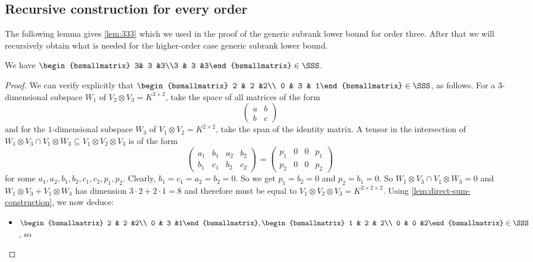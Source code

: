 \documentclass[10pt,a4paper]{article}
\theoremstyle{definition}
\theoremstyle{remark}
\begin{document}
\subsection{Recursive construction for every order}

The following lemma gives \autoref{lem:333} which we used in the proof of the generic subrank lower bound for order three. After that we will recursively obtain what is needed for the higher-order case generic subrank lower bound.

\begin{lemma}\label{lem:333-333}
We have $\begin{bsmallmatrix} 3& 3 &3\\3 & 3 &3\end{bsmallmatrix}\in \SSS$.
\end{lemma}
\begin{proof}
We can verify explicitly that $\begin{bsmallmatrix} 2 & 2 &2\\ 0 & 3 & 1\end{bsmallmatrix}\in \SSS$, as follows.
For a $3$-dimensional subspace $W_1$ of $V_2\otimes V_3=K^{2\times 2}$, take the space of all matrices of the form
$$
\begin{pmatrix}
a & b\\
b & c
\end{pmatrix}
$$
and for the $1$-dimensional subspace $W_3$ of $V_1\otimes V_2=K^{2\times 2}$, take the span of the identity matrix. 
A tensor in the intersection of $W_1\otimes V_3\cap V_1\otimes W_3\subseteq V_1\otimes V_2\otimes V_3$ is of the form
$$
\left(
\begin{array}{cc|cc}
a_1 & b_1 & a_2 & b_2\\
b_1 & c_1 & b_2 & c_2
\end{array}
\right)= \left(\begin{array}{cc|cc}
p_1 & 0  & 0  & p_1\\
p_2 & 0  & 0 & p_2
\end{array}\right)
$$
for some $a_1,a_2,b_1,b_2,c_1,c_2,p_1,p_2$. Clearly, $b_1=c_1=a_2=b_2=0$. So we get $p_1=b_2=0$ and $p_2=b_1=0$.
So $W_1\otimes V_3\cap V_1\otimes W_3=0$ and $W_1\otimes V_3+V_1\otimes W_3$ has dimension
$3\cdot 2+2\cdot 1=8$ and therefore must be equal to $V_1\otimes V_2\otimes V_3=K^{2\times 2\times 2}$. Using \autoref{lem:direct-sum-construction},
we now deduce:
\begin{itemize}
\item $\begin{bsmallmatrix} 2 & 2 &2\\ 0 & 3 &1\end{bsmallmatrix}, \begin{bsmallmatrix} 1 & 2 & 2\\ 0 & 0 &2\end{bsmallmatrix}\in \SSS$, so

\end{itemize}
\end{proof}
\end{document}
